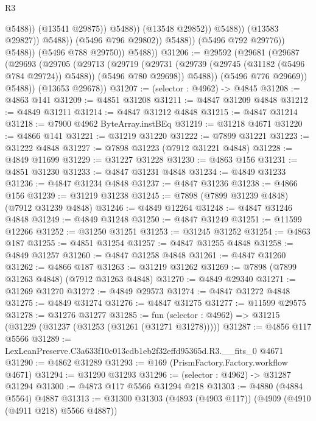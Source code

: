 \begin{lexlean}{R3}
\begin{coremodule}
                                            @5488))
                                        (@13541 @29875))
                                      @5488))
                                  (@13548 @29852))
                                @5488))
                            (@13583 @29827))
                          @5488))
                      (@5496 @796 @29802))
                    @5488))
                (@5496 @792 @29776))
              @5488))
          (@5496 @788 @29750))
        @5488))
@31206 := @29592
    (@29681
      (@29687
        (@29693
          (@29705
            (@29713
              (@29719
                (@29731 (@29739 (@29745 (@31182 (@5496 @784 @29724)) @5488)) (@5496 @780 @29698))
                @5488))
            (@5496 @776 @29669))
          @5488))
      (@13653 @29678))
@31207 := (selector : @4962) -> @4845
@31208 := @4863 @141
@31209 := @4851 @31208
@31211 := @4847 @31209 @4848
@31212 := @4849 @31211
@31214 := @4847 @31212 @4848
@31215 := @4847 @31214
@31218 := @7900 @4962 ByteArray.instBEq
@31219 := @31218 @4671
@31220 := @4866 @141
@31221 := @31219 @31220
@31222 := @7899 @31221
@31223 := @31222 @4848
@31227 := @7898 @31223 (@7912 @31221 @4848)
@31228 := @4849 @11699
@31229 := @31227 @31228
@31230 := @4863 @156
@31231 := @4851 @31230
@31233 := @4847 @31231 @4848
@31234 := @4849 @31233
@31236 := @4847 @31234 @4848
@31237 := @4847 @31236
@31238 := @4866 @156
@31239 := @31219 @31238
@31245 := @7898 (@7899 @31239 @4848) (@7912 @31239 @4848)
@31246 := @4849 @12264
@31248 := @4847 @31246 @4848
@31249 := @4849 @31248
@31250 := @4847 @31249
@31251 := @11599 @12266
@31252 := @31250 @31251
@31253 := @31245 @31252
@31254 := @4863 @187
@31255 := @4851 @31254
@31257 := @4847 @31255 @4848
@31258 := @4849 @31257
@31260 := @4847 @31258 @4848
@31261 := @4847 @31260
@31262 := @4866 @187
@31263 := @31219 @31262
@31269 := @7898 (@7899 @31263 @4848) (@7912 @31263 @4848)
@31270 := @4849 @29340
@31271 := @31269 @31270
@31272 := @4849 @29573
@31274 := @4847 @31272 @4848
@31275 := @4849 @31274
@31276 := @4847 @31275
@31277 := @11599 @29575
@31278 := @31276 @31277
@31285 := fun (selector : @4962) => @31215 (@31229 (@31237 (@31253 (@31261 (@31271 @31278)))))
@31287 := @4856 @117 @5566
@31289 := LexLeanPreserve.C3a633f10c013cdb1eb2f32effd95365d.R3.__fits_0 @4671
@31290 := @4862 @31289
@31293 := @169 (PrismFactory.Factory.workflow @4671)
@31294 := @31290 @31293
@31296 := (selector : @4962) -> @31287 @31294
@31300 := @4873 @117 @5566 @31294 @218
@31303 := @4880 (@4884 @5564) @4887
@31313 := @31300 @31303 (@4893 (@4903 @117)) (@4909 (@4910 (@4911 @218) @5566 @4887))

\end{coremodule}
\end{lexlean}
